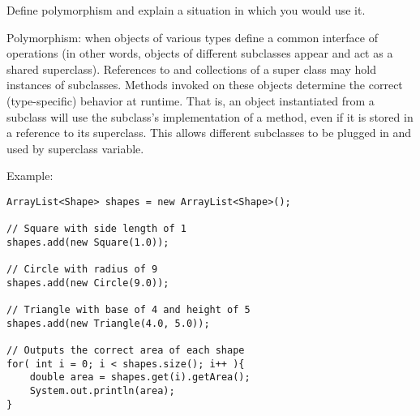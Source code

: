 Define polymorphism and explain a situation in which you would use it. \\
\begin{answer}
Polymorphism: when objects of various types define a common interface of operations (in other words, objects of different subclasses appear and act as a shared superclass). References to and collections of a super class may hold instances of subclasses. Methods invoked on these objects determine the correct (type-specific) behavior at runtime. That is, an object instantiated from a subclass will use the subclass's implementation of a method, even if it is stored in a reference to its superclass.
This allows different subclasses to be plugged in and used by superclass variable.

Example:

\begin{lstlisting}[basicstyle=\small]
ArrayList<Shape> shapes = new ArrayList<Shape>();

// Square with side length of 1
shapes.add(new Square(1.0));

// Circle with radius of 9
shapes.add(new Circle(9.0));

// Triangle with base of 4 and height of 5
shapes.add(new Triangle(4.0, 5.0));

// Outputs the correct area of each shape
for( int i = 0; i < shapes.size(); i++ ){ 
   	double area = shapes.get(i).getArea();
   	System.out.println(area);
}
\end{lstlisting}
\end{answer}
